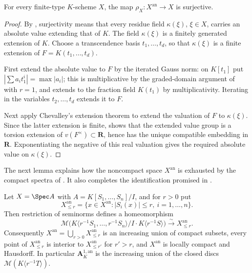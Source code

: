 \begin{proposition}
\label{prop:berk-support-surjective}
For every finite-type $K$-scheme $X$, the map
$\rho_X:X^{\mathrm{an}}\to X$ is surjective.
\end{proposition}

\begin{proof}
By , surjectivity means that every
residue field $\kappa(\xi)$, $\xi\in X$, carries an absolute value
extending that of $K$.  The field $\kappa(\xi)$ is a finitely
generated extension of $K$.  Choose a transcendence basis
$t_1,\ldots,t_d$, so that $\kappa(\xi)$ is a finite extension of
$F=K(t_1,\ldots,t_d)$.

First extend the absolute value to $F$ by the iterated Gauss norm: on
$K[t_1]$ put $|\sum a_it_1^i|=\max|a_i|$; this is multiplicative by
the graded-domain argument of  with $r=1$, and
extends to the fraction field $K(t_1)$ by multiplicativity.  Iterating
in the variables $t_2,\ldots,t_d$ extends it to $F$.

Next apply Chevalley's extension theorem
 to extend the valuation of $F$ to
$\kappa(\xi)$.  Since the latter extension is finite,
 shows that the extended value
group is a torsion extension of $v(F^\times)\subset\mathbf R$, hence
has the unique compatible embedding in $\mathbf R$.  Exponentiating
the negative of this real valuation gives the required absolute value on
$\kappa(\xi)$.
\end{proof}

The next lemma explains how the noncompact space $X^{\mathrm{an}}$ is
exhausted by the compact spectra of .  It also
completes the identification promised in .

\begin{lemma}\label{lem:berk-polydisc-exhaustion}
Let $X=\Spec A$ with $A=K[S_1,\ldots,S_n]/I$, and for $r>0$ put
\[
 X^{\mathrm{an}}_{\leq r}
 =\{x\in X^{\mathrm{an}}:|S_i(x)|\leq r,\ i=1,\ldots,n\}.
\]
Then restriction of seminorms defines a homeomorphism
\[
 \mathcal M\bigl(K\langle r^{-1}S_1,\ldots,r^{-1}S_n\rangle/
 I\cdot K\langle r^{-1}S\rangle\bigr)
 \xrightarrow{\ \sim\ }
 X^{\mathrm{an}}_{\leq r}.
\]
Consequently $X^{\mathrm{an}}=\bigcup_{r>0}X^{\mathrm{an}}_{\leq r}$ is
an increasing union of compact subsets, every point of
$X^{\mathrm{an}}_{\leq r}$ is interior to $X^{\mathrm{an}}_{\leq r'}$
for $r'>r$, and $X^{\mathrm{an}}$ is locally compact and Hausdorff.
In particular $\mathbf A^{1,\mathrm{an}}_K$ is the increasing union of
the closed discs $\mathcal M(K\langle r^{-1}T\rangle)$.
\end{lemma}

